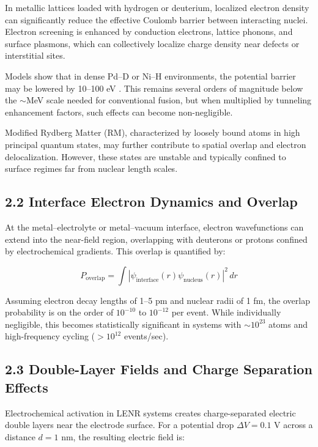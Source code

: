     In metallic lattices loaded with hydrogen or deuterium, localized electron density can significantly reduce the effective Coulomb barrier between interacting nuclei. Electron screening is enhanced by conduction electrons, lattice phonons, and surface plasmons, which can collectively localize charge density near defects or interstitial sites.
    
    Models show that in dense Pd–D or Ni–H environments, the potential barrier may be lowered by 10–100 eV \cite{schwinger1990}. This remains several orders of magnitude below the $\sim$MeV scale needed for conventional fusion, but when multiplied by tunneling enhancement factors, such effects can become non-negligible.
    
    Modified Rydberg Matter (RM), characterized by loosely bound atoms in high principal quantum states, may further contribute to spatial overlap and electron delocalization. However, these states are unstable and typically confined to surface regimes far from nuclear length scales.
    
    \subsection{2.2 Interface Electron Dynamics and Overlap}
    
    At the metal–electrolyte or metal–vacuum interface, electron wavefunctions can extend into the near-field region, overlapping with deuterons or protons confined by electrochemical gradients. This overlap is quantified by:
    
    \[
    P_{\text{overlap}} = \int |\psi_{\text{interface}}(r) \psi_{\text{nucleus}}(r)|^2 \, dr
    \]
    
    Assuming electron decay lengths of 1–5 pm and nuclear radii of 1 fm, the overlap probability is on the order of $10^{-10}$ to $10^{-12}$ per event. While individually negligible, this becomes statistically significant in systems with $\sim 10^{23}$ atoms and high-frequency cycling ($>10^{12}$ events/sec).
    
    \subsection{2.3 Double-Layer Fields and Charge Separation Effects}
    
    Electrochemical activation in LENR systems creates charge-separated electric double layers near the electrode surface. For a potential drop $\Delta V = 0.1$ V across a distance $d = 1$ nm, the resulting electric field is:
    
